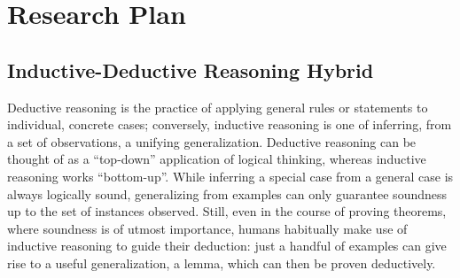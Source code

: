\section{Research Plan }

\subsection{Inductive-Deductive Reasoning Hybrid}

Deductive reasoning is the practice of applying general rules or statements to
individual, concrete cases; conversely, inductive reasoning is one of inferring,
from a set of observations, a unifying generalization.
Deductive reasoning can be thought of as a ``top-down'' application of logical
thinking, whereas inductive reasoning works ``bottom-up''.
While inferring a special case from a general case is always logically sound,
generalizing from examples can only guarantee soundness up to the set of
instances observed.
Still, even in the course of proving theorems, where soundness is of utmost
importance, humans habitually make use of inductive reasoning to guide their
deduction:
just a handful of examples can give rise to a useful generalization, a lemma,
which can then be proven deductively.

